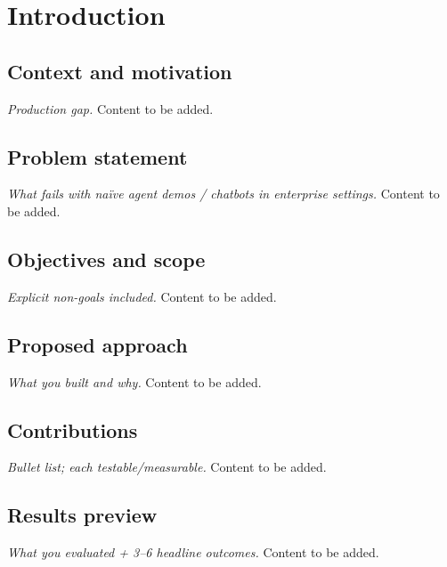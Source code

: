 \documentclass[a4paper,twoside]{sapthesis}
\begin{document}
\tableofcontents



\mainmatter


\chapter{Introduction}
\label{ch:introduction}

\section{Context and motivation}
\label{sec:context-motivation}
\emph{Production gap.} Content to be added.

\section{Problem statement}
\label{sec:problem-statement}
\emph{What fails with naïve agent demos / chatbots in enterprise settings.} Content to be added.

\section{Objectives and scope}
\label{sec:objectives-scope}
\emph{Explicit non-goals included.} Content to be added.

\section{Proposed approach}
\label{sec:proposed-approach}
\emph{What you built and why.} Content to be added.

\section{Contributions}
\label{sec:contributions}
\emph{Bullet list; each testable/measurable.} Content to be added.

\section{Results preview}
\label{sec:results-preview}
\emph{What you evaluated + 3–6 headline outcomes.} Content to be added.
\end{document}
